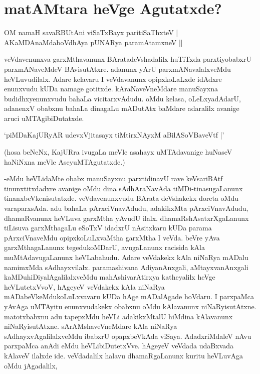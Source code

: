 \chapter{matAMtara heVge Agutatxde?}

\begin{shloka}
OM namaH savaRBUtAni viSaTxBayx paritiSaThxteV |\\
AKaMDAnaMdaboVdhAya pUNARya paramAtamxneV ||
\end{shloka}

veVdavenunxva garxMthavanunx BAratadeVshadalilx huTiTxda parxtiyobabxrU parxmANaveMdeV BAvisutAtxre. adanunx yArU parxmANavalalxveMdu heVLuvudilalx. Adare kelavaru I veVdavanunx opipxkoLaLxde idAdxre enunxvudu kUDa namage gotitxde. kAraNaveVneMdare manuSayxna budidhxyenunxvudu bahaLa vicitarxvAdudu. oMdu kelasa, oLeLxyadAdarU, adanenxV obabxnu bahaLa dinagaLu mADutAtx baMdare adaralilx avanige aruci uMTAgibiDutatxde.

\begin{shloka}
`piMDaKajURyAR udevxVjitasayx tiMtirxNAyxM aBilASoVBaveVtf |'
\end{shloka}

(hosa beNeNx, KajURra ivugaLa meVle asahayx uMTAdavanige huNaseV haNiNxna meVle AseyuMTAgutatxde.)

-eMdu heVLidaMte obabx manuSayxnu parxtidinavU rave keVsariBAtf tinunxtitxdadxre avanige oMdu dina sAdhAraNavAda tiMDi-tinasugaLanunx tinanxbeVkenisutatxde. veVdavenunxvudu BArata deVshakekx doreta oMdu varaparxsAda. adu bahaLa pArxciVnavAdudu, adakikxMta pArxciVnavAdudu, dhamaRvanunx heVLuva garxMtha yAvudU ilalx. dhamaRshAsatxrXgaLanunx tiLisuva garxMthagaLu eSoTxV idadxrU nAsitxkaru kUDa parama pArxciVnaveMdu opipxkoLuLxvaMtha garxMtha I veVda. beVre yAva garxMthagaLanunx tegedukoMDarU, avugaLanunx racisida kAla muMtAdavugaLanunx heVLabahudu. Adare veVdakekx kAla niNaRya mADalu namimxMda sAdhayxvilalx. paramashivana AdiyanAnxgali, aMtayxvanAnxgali kaMDuhiDiyalAgalilalxveMdu mahAshivarAtirxya katheyalilx heVge heVLutetxVvoV, hAgeyeV veVdakekx kAla niNaRya mADabeVkeMdukoLuLxvavaru kUDa hAge mADalAgade hoVdaru. I parxpaMca yAvAga uMTAyitu enunxvudakekx obabxnu oMdu kAlavanunx niNaRyisutAtxne. matotxbabxnu adu tapepxMdu heVLi adakikxMtalU hiMdina kAlavanunx niNaRyisutAtxne. sArAMshaveVneMdare kAla niNaRya sAdhayxvAgalilalxveMdu ibabxrU opapxbeVkAda viSaya. AdadxriMdaleV nAvu parxpaMca anAdi eMdu heVLibiDutetxVve. hAgeyeV veVdada udaBxvada kAlaveV ilalxde ide. veVdadalilx halavu dhamaRgaLanunx kuritu heVLuvAga oMdu jAgadalilx, 

